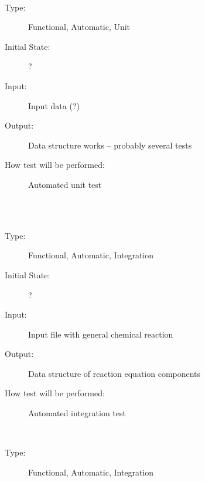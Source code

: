 \documentclass[12pt, titlepage]{article}
\newcounter{testnum} %
\begin{document}
\begin{addmargin}[2em]{0em}
\\
\begin{addmargin}[2em]{0em}
\begin{description}
\item[Type:] Functional, Automatic, Unit
					
\item[Initial State:] ?
					
\item[Input:] Input data (?)
					
\item[Output:] Data structure works -- probably several tests
					
\item[How test will be performed:] Automated unit test\\
\end{description}
\end{addmargin}

\\
\\
\begin{addmargin}[2em]{0em}
\begin{description}
\item[Type:] Functional, Automatic, Integration
					
\item[Initial State:] ?
					
\item[Input:] Input file with general chemical reaction
					
\item[Output:] Data structure of reaction equation components
					
\item[How test will be performed:] Automated integration test \\
\end{description}
\end{addmargin}	

\\
\begin{addmargin}[2em]{0em}
\begin{description}
\item[Type:] Functional, Automatic, Integration
					

\end{description}
\end{addmargin}
\end{addmargin}
\end{document}
